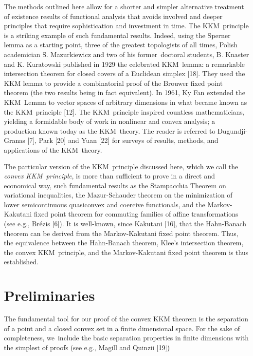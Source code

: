 \documentclass{article}
\begin{document}
The methods outlined here allow for a shorter and simpler alternative
treatment of existence results of functional analysis that avoids involved
and deeper principles that require sophistication and investment in time.
The KKM\ principle is a striking example of such fundamental results.
Indeed, using the Sperner lemma as a starting point, three of the greatest
topologists of all times, Polish academician S. Mazurkiewicz and two of his
former\ doctoral students, B. Knaster and K. Kuratowski published in 1929
the celebrated KKM\ lemma: a remarkable intersection theorem for closed
covers of a Euclidean simplex [18]. They used the KKM lemma to provide a
combinatorial proof of the Brouwer fixed point theorem (the two results
being in fact equivalent). In 1961, Ky Fan extended the KKM\ Lemma to vector
spaces of arbitrary dimensions in what became known as the KKM\ principle
[12]. The KKM\ principle inspired countless mathematicians, yielding a
formidable body of work in nonlinear and convex analysis; a production known
today as the KKM\ theory. The reader is referred to Dugundji-Granas [7],
Park [20] and Yuan [22] for surveys of results, methods, and applications of
the KKM\ theory.

The particular version of the KKM\ principle discussed here, which we call
the \textit{convex KKM\ principle}, is more than sufficient to prove in a
direct and economical way, such fundamental results as the Stampacchia
Theorem on variational inequalities, the Mazur-Schauder theorem on the
minimization of lower semicontinuous quasiconvex and coercive functionals,
and the Markov-Kakutani fixed point theorem for commuting families of affine
transformations (see e.g., Br\'{e}zis [6]). It is well-known, since Kakutani
[16], that the Hahn-Banach theorem can be derived from the Markov-Kakutani
fixed point theorem. Thus, the equivalence between the Hahn-Banach theorem,
Klee's intersection theorem, the convex KKM\ principle, and the
Markov-Kakutani fixed point theorem is thus established.

\section{Preliminaries}

The fundamental tool for our proof of the convex KKM theorem is the
separation of a point and a closed convex set in a finite dimensional space.
For the sake of completeness, we\ include the basic separation properties in
finite dimensions with the simplest of proofs (see e.g., Magill and Quinzii
[19])\bigskip
\end{document}
